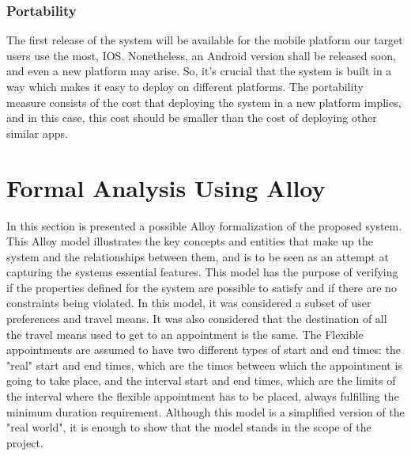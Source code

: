 \documentclass[12pt]{article}
\begin{document}
\subsubsection{Portability}
The first release of the system will be available for the mobile platform our target users use the most, IOS. Nonetheless, an Android version shall be released soon, and even a new platform may arise. So, it's crucial that the system is built in a way which makes it easy to deploy on different platforms. The portability measure consists of the cost that deploying the system in a new platform implies, and in this case, this cost should be smaller than the cost of deploying other similar apps.

\section{Formal Analysis Using Alloy}
In this section is presented a possible Alloy formalization of the proposed system. This Alloy model illustrates the key concepts and entities that make up the system and the relationships between them, and is to be seen as an attempt at capturing the systems essential features.
This model has the purpose of verifying if the properties defined for the system are possible to satisfy and if there are no constraints being violated.
In this model, it was considered a subset of user preferences and travel means. It was also considered that the destination of all the travel means used to get to an appointment is the same. The Flexible appointments are assumed to have two different types of start and end times: the "real" start and end times, which are the times between which the appointment is going to take place, and the interval start and end times, which are the limits of the interval where the flexible appointment has to be placed, always fulfilling the minimum duration requirement.
Although this model is a simplified version of the "real world", it is enough to show that the model stands in the scope of the project. 
\end{document}
